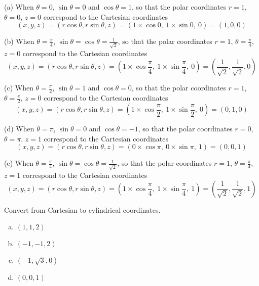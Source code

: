 \begin{solution}
(a) When $\theta=0$,  $\sin\theta=0$ and $\cos\theta=1$, so that
the polar coordinates $r=1$, $\theta=0$, $z=0$ correspond to the Cartesian
coordinates
\begin{equation*}
(x,y,z) = (r\cos\theta,r\sin\theta,z)
        = (1\times\cos 0,\  1\times\sin 0,\ 0)
        =(1,0,0)
\end{equation*}

(b) When $\theta=\frac{\pi}{4}$,  $\sin\theta=\cos\theta=\frac{1}{\sqrt{2}}$, 
so that the polar coordinates $r=1$, $\theta=\frac{\pi}{4}$, $z=0$ correspond 
to the Cartesian coordinates
\begin{equation*}
(x,y,z) = (r\cos\theta,r\sin\theta,z)
  = \left(1\times\cos \frac{\pi}{4},\  1\times\sin \frac{\pi}{4},\ 0\right)
  = \left(\frac{1}{\sqrt{2}},\frac{1}{\sqrt{2}},0\right)
\end{equation*}

(c) When $\theta=\frac{\pi}{2}$,  $\sin\theta=1$ and $\cos\theta=0$, 
so that the polar coordinates $r=1$, $\theta=\frac{\pi}{2}$, $z=0$ correspond 
to the Cartesian coordinates
\begin{equation*}
(x,y,z) = (r\cos\theta,r\sin\theta,z)
  = \left(1\times\cos \frac{\pi}{2},\  1\times\sin \frac{\pi}{2},\ 0\right)
  = (0,1,0)
\end{equation*}

(d) When $\theta=\pi$,  $\sin\theta=0$ and $\cos\theta=-1$, 
so that the polar coordinates $r=0$, $\theta=\pi$, $z=1$ correspond 
to the Cartesian coordinates
\begin{equation*}
(x,y,z) = (r\cos\theta,r\sin\theta,z)
  = \left(0\times\cos\pi,\  0\times\sin\pi,\ 1\right)
  = (0,0,1)
\end{equation*}

(e) When $\theta=\frac{\pi}{4}$,  $\sin\theta=\cos\theta=\frac{1}{\sqrt{2}}$, 
so that the polar coordinates $r=1$, $\theta=\frac{\pi}{4}$, $z=1$ correspond 
to the Cartesian coordinates
\begin{equation*}
(x,y,z) = (r\cos\theta,r\sin\theta,z)
  = \left(1\times\cos \frac{\pi}{4},\  1\times\sin \frac{\pi}{4},\ 1\right)
  = \left(\frac{1}{\sqrt{2}},\frac{1}{\sqrt{2}},1\right)
\end{equation*}

\end{solution}

\begin{question}
Convert from Cartesian to cylindrical coordinates.
\begin{enumerate}[(a)]
\item $(1,1,2)$
\item $(-1,-1,2)$
\item $(-1,\sqrt{3}, 0)$
\item $(0,0,1)$
\end{enumerate}

\end{question}

